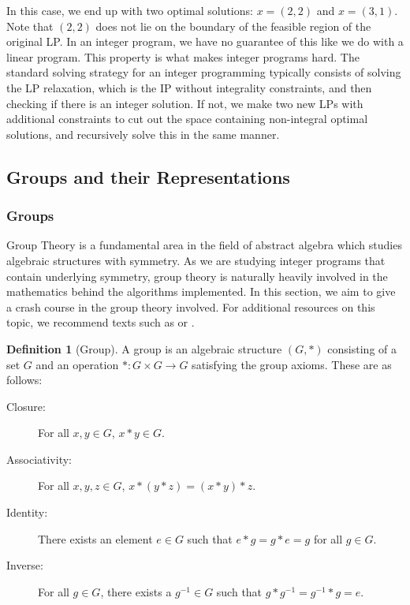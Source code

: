 \documentclass[11pt]{article} %
\theoremstyle{definition}
\newtheorem{definition}[theorem]{Definition}
\theoremstyle{remark}
\begin{document}
In this case, we end up with two optimal solutions: $x = (2,2)$ and $x = (3,1)$. Note that $(2,2)$ does not lie on the boundary of the feasible region of the original LP. In an integer program,  we have no guarantee of this like we do with a linear program. This property is what makes integer programs hard. The standard solving strategy for an integer programming typically consists of solving the LP relaxation, which is the IP without integrality constraints, and then checking if there is an integer solution. If not, we make two new LPs with additional constraints to cut out the space containing non-integral optimal solutions, and recursively solve this in the same manner.

\subsection{Groups and their Representations}

\subsubsection{Groups}

Group Theory is a fundamental area in the field of abstract algebra which studies algebraic structures with symmetry. As we are studying integer programs that contain underlying symmetry, group theory is naturally heavily involved in the mathematics behind the algorithms implemented. In this section, we aim to give a crash course in the group theory involved. For additional resources on this topic, we recommend texts such as \cite{grouptext} or \cite{algebra}.

\begin{definition} [Group]
A group is an algebraic structure $(G,*)$ consisting of a set $G$ and an operation $* : G \times G \to G$ satisfying the group axioms. These are as follows:
\begin{description}
\item[Closure:] For all $x,y \in G$, $x*y \in G$.
\item[Associativity:] For all $x,y,z \in G$, $x*(y*z) = (x*y)*z$.
\item[Identity:] There exists an element $e \in G$ such that $e*g = g*e = g$ for all $g \in G$.
\item[Inverse:] For all $g \in G$, there exists a $g^{-1} \in G$ such that $g*g^{-1} = g^{-1}*g = e$.
\end{description}
\end{definition}
\end{document}
